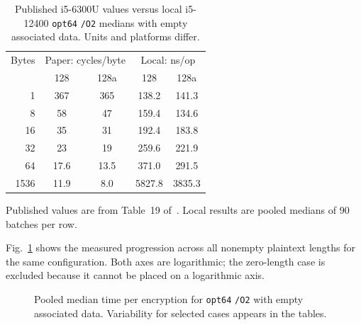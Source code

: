 \documentclass[conference]{IEEEtran}
\begin{document}
\begin{table}[htbp]
\caption{Published i5-6300U values versus local i5-12400 \texttt{opt64}
\texttt{/O2} medians with empty associated data. Units and platforms differ.}
\label{tab:comparison}
\centering
\begin{tabular}{rcccc}
\hline
Bytes & \multicolumn{2}{c}{Paper: cycles/byte} &
        \multicolumn{2}{c}{Local: ns/op} \\
& 128 & 128a & 128 & 128a \\
\hline
1    & 367  & 365  & 138.2  & 141.3 \\
8    & 58   & 47   & 159.4  & 134.6 \\
16   & 35   & 31   & 192.4  & 183.8 \\
32   & 23   & 19   & 259.6  & 221.9 \\
64   & 17.6 & 13.5 & 371.0  & 291.5 \\
1536 & 11.9 & 8.0  & 5827.8 & 3835.3 \\
\hline
\end{tabular}

\smallskip
\footnotesize Published values are from Table~19 of~\cite{ascon2021}.
Local results are pooled medians of 90 batches per row.
\end{table}

Fig.~\ref{fig:length} shows the measured progression across all nonempty
plaintext lengths for the same configuration. Both axes are logarithmic; the
zero-length case is excluded because it cannot be placed on a logarithmic
axis.

\begin{figure}[htbp]
\centering
{}
\caption{Pooled median time per encryption for \texttt{opt64} \texttt{/O2}
with empty associated data. Variability for selected cases appears in the
tables.}
\label{fig:length}
\end{figure}
\end{document}
